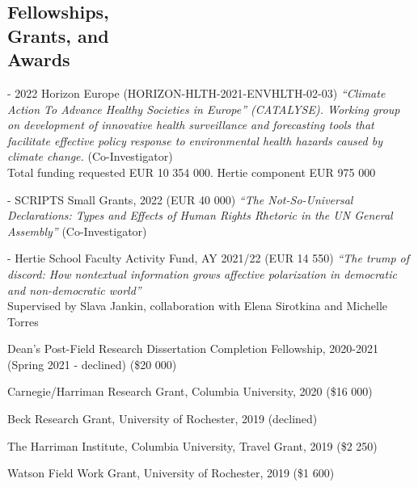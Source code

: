\documentclass[margin,line,10.95pt]{res}
\begin{document}
\begin{resume}
\section{\sc Fellowships,   \\ Grants,  and  \\Awards}

- 2022 Horizon Europe (HORIZON-HLTH-2021-ENVHLTH-02-03) \textit{“Climate Action To Advance Healthy Societies in Europe” (CATALYSE). Working group on development of innovative health surveillance and forecasting tools that facilitate effective policy response to environmental health hazards caused by climate change.} (Co-Investigator)
\\
Total funding requested EUR 10 354 000. Hertie component EUR 975 000

\vspace*{-3.5mm}

- SCRIPTS Small Grants, 2022 (EUR 40 000) \textit{“The Not-So-Universal Declarations: Types and Effects of Human Rights Rhetoric in the UN General Assembly”} (Co-Investigator)

\vspace*{-3.5mm}

- Hertie School Faculty Activity Fund, AY 2021/22 (EUR 14 550) \textit{“The trump of discord: How nontextual information grows affective polarization in democratic and non-democratic world”} 
\\
Supervised by Slava Jankin, collaboration with Elena Sirotkina and Michelle Torres
\\

\vspace*{-4.5mm}

Dean's Post-Field Research Dissertation Completion Fellowship, 2020-2021 (Spring 2021 - declined) (\$20 000)
\vspace*{-4.5mm}

Carnegie/Harriman Research Grant, Columbia University, 2020 (\$16 000)
\vspace*{-4.5mm}

Beck Research Grant, University of Rochester, 2019 (declined)
\vspace*{-4.5mm}

The Harriman Institute, Columbia University, Travel Grant, 2019 (\$2 250)
\vspace*{-4.5mm}

Watson Field Work Grant, University of Rochester, 2019 (\$1 600)
\vspace*{-4.5mm}


\end{resume}
\end{document}

